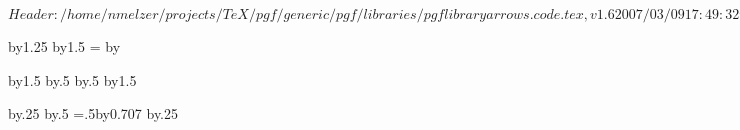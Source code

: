 %
%
%

\ProvidesFileRCS[v\pgfversion] $Header: /home/nmelzer/projects/TeX/pgf/generic/pgf/libraries/pgflibraryarrows.code.tex,v 1.6 2007/03/09 17:49:32 tantau Exp $



\pgfarrowsdeclare{[}{]}
{
  \@tempdima=1pt%
  \advance\@tempdima by1.25\pgflinewidth%
  \pgfarrowsleftextend{+-\@tempdima}
  \pgfarrowsrightextend{+.5\pgflinewidth}
}
{
  \@tempdima=2pt%
  \advance\@tempdima by1.5\pgflinewidth%
  \@tempdimb=\@tempdima%
  \advance\@tempdimb by\pgflinewidth%
  \pgfsetdash{}{+0pt}
  \pgfsetmiterjoin
  \pgfsetbuttcap
  \pgfpathlineto{\pgfqpoint{0pt}{\@tempdima}}
  \pgfusepathqstroke
}

\pgfarrowsdeclarereversed{]}{[}{[}{]}



\pgfarrowsdeclare{(}{)}
{
  \@tempdima=2pt%
  \advance\@tempdima by1.5\pgflinewidth%
  \@tempdima\advance\@tempdimb by.5\pgflinewidth%
  \pgfarrowsrightextend{+\@tempdimb}
  \@tempdima\advance\@tempdimb by.5\pgflinewidth%
  \pgfarrowsleftextend{+-\@tempdimb}
}
{
  \@tempdima=2pt%
  \advance\@tempdima by1.5\pgflinewidth%
  \pgfsetdash{}{+0pt}
  \pgfsetroundcap
  \pgfpathcurveto
  {}
  {}
  {}
  \pgfusepathqstroke
}

\pgfarrowsdeclarereversed{)}{(}{(}{)}





{
  \@tempdima=0.3pt%
  \advance\@tempdima by.25\pgflinewidth%
  \@tempdima\advance\@tempdimb by.5\pgflinewidth%
  \pgfarrowsleftextend{+-\@tempdimb}
  \@tempdimb=.5\@tempdima\advance\@tempdimb by0.707\pgflinewidth%
  \pgfarrowsrightextend{+\@tempdimb}
}
{
  \@tempdima=0.3pt%
  \advance\@tempdima by.25\pgflinewidth%
  \pgfsetdash{}{+0pt}
  \pgfsetroundcap
  \pgfsetmiterjoin
  \pgfusepathqstroke
}

